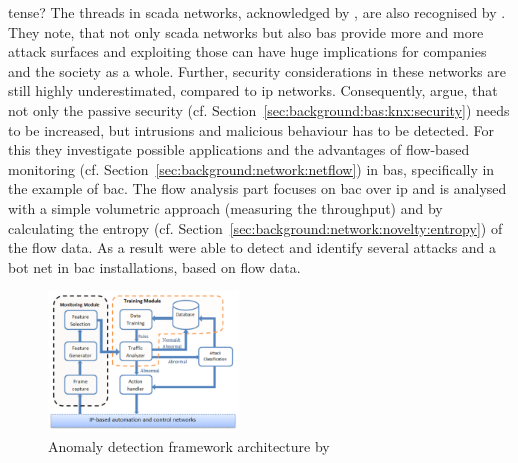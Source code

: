 \alert{tense?}
The threads in \gls{scada} networks, acknowledged by \textcite{Yang2006}, are also recognised by \textcite{Celeda2012}. They note, that not only \gls{scada} networks but also \gls{bas} provide more and more attack surfaces and exploiting those can have huge implications for companies and the society as a whole.
Further, security considerations in these networks are still highly underestimated, compared to \gls{ip} networks.
Consequently, \textcite{Celeda2012} argue, that not only the passive security (cf. Section~\ref{sec:background:bas:knx:security}) needs to be increased, but intrusions and malicious behaviour has to be detected. For this they investigate possible applications and the advantages of flow-based monitoring (cf. Section~\ref{sec:background:network:netflow}) in \gls{bas}, specifically in the example of \gls{bac}.
The flow analysis part focuses on \gls{bac} over \gls{ip} and is analysed with a simple volumetric approach (measuring the throughput) and by calculating the entropy (cf. Section~\ref{sec:background:network:novelty:entropy}) of the flow data.
As a result \textcite{Celeda2012} were able to detect and identify several attacks and a bot net in \gls{bac} installations, based on flow data.

\begin{figure}
	\centering
	\includegraphics[width=0.45\textwidth,keepaspectratio]{figures/300-Pan2014-architecture.png}
	\caption[Anomaly detection framework architecture by Pan, Hairi, and Al-Nashif]{Anomaly detection framework architecture by \textcite{Pan2014}}
	\label{fig:background:prior-work:pan-architecture}
\end{figure}

